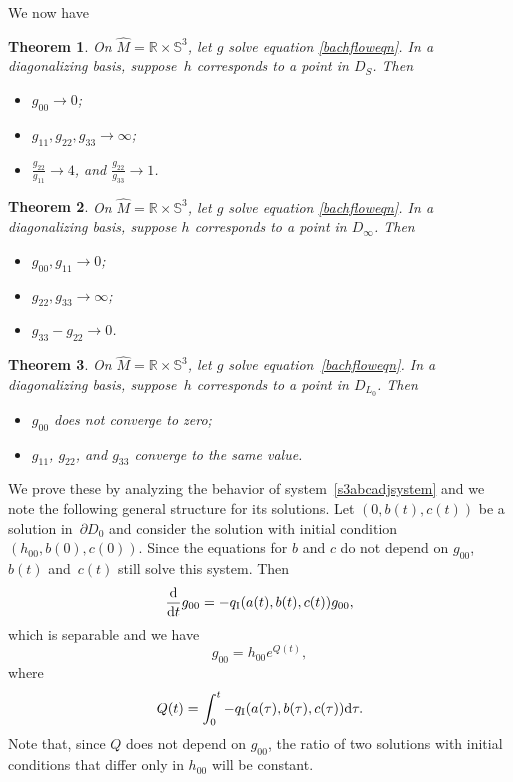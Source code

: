 \documentclass[10pt,a4paper]{amsart}
\numberwithin{equation}{section}
\newtheorem{Theorem}{Theorem}[section]
\newcommand{\dtime}{\frac{{\rm d}}{{\rm d} t}} %
\begin{document}
We now have

\begin{Theorem} \label{s3thm1} On $\widehat{M} = \mathbb{R} \times \mathbb{S}^3$, let $g$ solve equation \eqref{bachfloweqn}. In a diagonalizing basis, suppose~$h$ corresponds to a point in $D_S$. Then
\begin{itemize}\itemsep=0pt
\item $g_{00} \rightarrow 0$;
\item $g_{11}, g_{22}, g_{33} \rightarrow \infty$;
\item $\frac{g_{22}}{g_{11}} \rightarrow 4$, and $\frac{g_{22}}{g_{33}} \rightarrow 1$.
\end{itemize}
\end{Theorem}

\begin{Theorem} \label{s3thm2}
On $\widehat{M} = \mathbb{R} \times \mathbb{S}^3$, let $g$ solve equation \eqref{bachfloweqn}. In a diagonalizing basis, suppose $h$ corresponds to a point in $D_{\infty}$. Then
\begin{itemize}\itemsep=0pt
\item $g_{00}, g_{11} \rightarrow 0$;
\item $g_{22}, g_{33} \rightarrow \infty$;
\item $g_{33} - g_{22} \rightarrow 0$.
\end{itemize}
\end{Theorem}

\begin{Theorem} \label{s3thm3}
On $\widehat{M} = \mathbb{R} \times \mathbb{S}^3$, let $g$ solve equation~\eqref{bachfloweqn}. In a diagonalizing basis, suppose~$h$ corresponds to a point in $D_{L_0}$. Then
\begin{itemize}\itemsep=0pt
\item $g_{00}$ does not converge to zero;
\item $g_{11}$, $g_{22}$, and $g_{33}$ converge to the same value.
\end{itemize}
\end{Theorem}

We prove these by analyzing the behavior of system~\eqref{s3abcadjsystem} and we note the following general structure for its solutions. Let $(0, b(t), c(t))$ be a solution in~$\partial D_0$ and consider the solution with initial condition $(h_{00}, b(0), c(0))$. Since the equations for $b$ and $c$ do not depend on $g_{00}$, $b(t)$ and~$c(t)$ still solve this system. Then
\[
\dtime g_{00} = -q_{\rm I}(a(t), b(t), c(t)) g_{00},
\]
which is separable and we have
\[
g_{00} = h_{00} e^{Q(t)},
\]
where
\begin{gather} \label{s3integraleqn}
Q(t) = \int_0^t -q_{\rm I}(a(\tau), b(\tau), c(\tau)) {\rm d}\tau.
\end{gather}
Note that, since $Q$ does not depend on $g_{00}$, the ratio of two solutions with initial conditions that differ only in $h_{00}$ will be constant.
\end{document}

